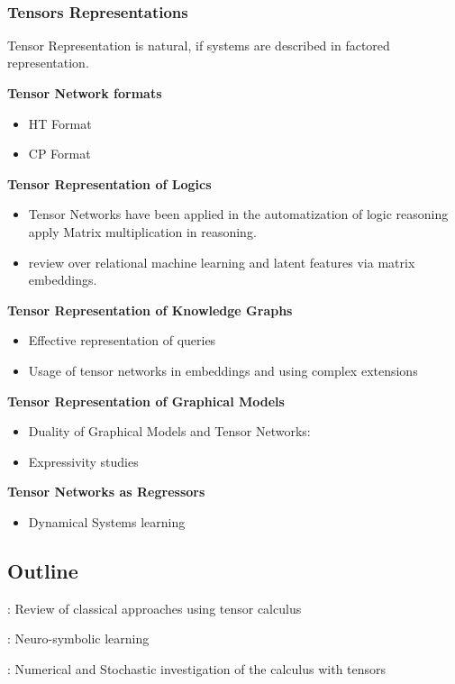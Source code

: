  


\subsubsection{Tensors Representations}

Tensor Representation is natural, if systems are described in factored representation.

\textbf{Tensor Network formats}
\begin{itemize}
	\item HT Format \cite{hackbusch_scheme_2009}
	\item CP Format 
\end{itemize}


\textbf{Tensor Representation of Logics}
\begin{itemize}
	\item Tensor Networks have been applied in the automatization of logic reasoning \cite{li_linear_2017, sato_linear_2017} apply Matrix multiplication in reasoning.
	\item \cite{nickel_review_2016} review over relational machine learning and latent features via matrix embeddings.
\end{itemize}

\textbf{Tensor Representation of Knowledge Graphs}
\begin{itemize}
	\item Effective representation of queries 
	\item Usage of tensor networks in embeddings \cite{yang_embedding_2015} and using complex extensions \cite{trouillon_complex_2017, trouillon_knowledge_2017}
\end{itemize}


\textbf{Tensor Representation of Graphical Models}
\begin{itemize}
	\item Duality of Graphical Models and Tensor Networks:
\cite{robeva_duality_2019}
	\item Expressivity studies \cite{glasser_expressive_2019}
\end{itemize}



\textbf{Tensor Networks as Regressors}
\begin{itemize}
	\item Dynamical Systems learning \cite{gels_multidimensional_2019, goesmann_tensor_2020}
\end{itemize}





\subsection{Outline}

: Review of classical approaches using tensor calculus

: Neuro-symbolic learning

: Numerical and Stochastic investigation of the calculus with tensors


